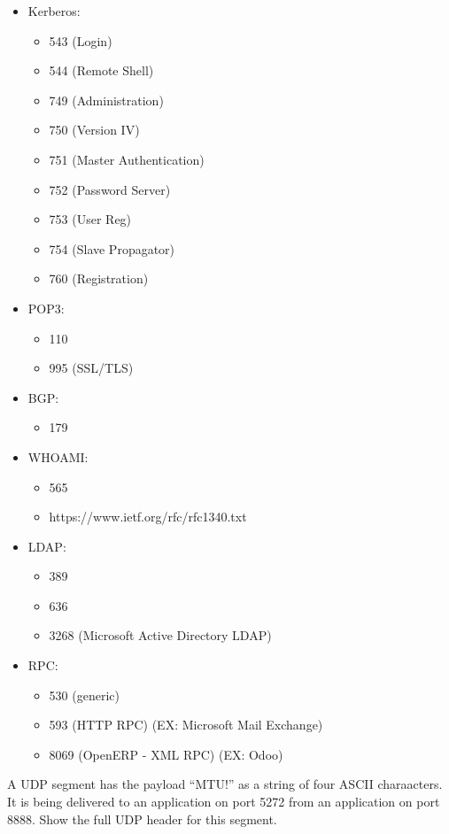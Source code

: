 \documentclass[12pt,addpoints,answers]{exam}
\begin{document}
\begin{questions}
\begin{solution}
\begin{itemize}
		\item Kerberos:
			\begin{itemize}
				\item 543 (Login)
				\item 544 (Remote Shell)
				\item 749 (Administration)
				\item 750 (Version IV)
				\item 751 (Master Authentication)
				\item 752 (Password Server)
				\item 753 (User Reg)
				\item 754 (Slave Propagator)
				\item 760 (Registration) 
			\end{itemize}
		\item POP3:
			\begin{itemize}
				\item 110
				\item 995 (SSL/TLS)
			\end{itemize}
		\item BGP:
			\begin{itemize}
				\item 179
			\end{itemize}
		\item WHOAMI:
			\begin{itemize}
				\item 565
				\item https://www.ietf.org/rfc/rfc1340.txt
			\end{itemize}
		\item LDAP:
			\begin{itemize}
				\item 389
				\item 636
				\item 3268 (Microsoft Active Directory LDAP)
			\end{itemize}
		\item RPC:
			\begin{itemize}
				\item 530 (generic)
				\item 593 (HTTP RPC) (EX: Microsoft Mail Exchange)
				\item 8069 (OpenERP - XML RPC) (EX: Odoo)
			\end{itemize}
	\end{itemize}
\end{solution}

\question[16] A UDP segment has the payload ``MTU!'' as a string of four ASCII charaacters. It is being delivered to an application on port 5272 from an application on port 8888. Show the full UDP header for this segment.


\end{questions}
\end{document}
